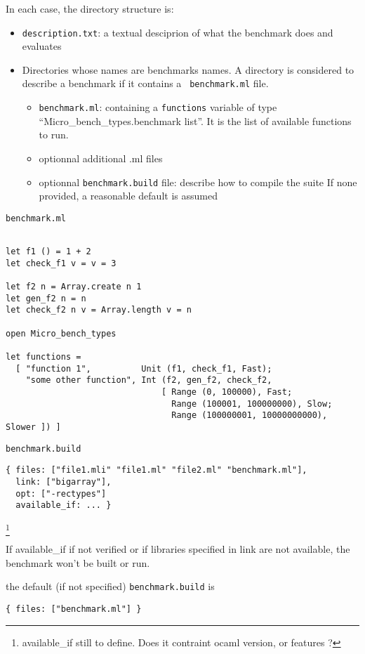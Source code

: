 \documentclass[11pt,a4paper]{article}
\begin{document}
In each case, the directory structure is:

\begin{itemize}
\item {\tt description.txt}: a textual desciprion of what the benchmark does and evaluates
\item Directories whose names are benchmarks names. A directory is
  considered to describe a benchmark if it contains a {\tt
    benchmark.ml} file.
  \begin{itemize}
  \item {\tt benchmark.ml}: containing a {\tt functions} variable of
    type ``Micro\_bench\_types.benchmark list''. It is the list of
    available functions to run.
  \item optionnal additional .ml files
  \item optionnal {\tt benchmark.build} file: describe how to compile the
    suite If none provided, a reasonable default is assumed
  \end{itemize}
\end{itemize}

{\tt benchmark.ml}
\begin{verbatim}

let f1 () = 1 + 2
let check_f1 v = v = 3

let f2 n = Array.create n 1
let gen_f2 n = n
let check_f2 n v = Array.length v = n

open Micro_bench_types

let functions =
  [ "function 1",          Unit (f1, check_f1, Fast);
    "some other function", Int (f2, gen_f2, check_f2,
                               [ Range (0, 100000), Fast;
                                 Range (100001, 100000000), Slow;
                                 Range (100000001, 10000000000), Slower ]) ]

\end{verbatim}

{\tt benchmark.build}
\begin{verbatim}
{ files: ["file1.mli" "file1.ml" "file2.ml" "benchmark.ml"],
  link: ["bigarray"],
  opt: ["-rectypes"]
  available_if: ... }
\end{verbatim}
\footnote{available\_if still to define. Does it contraint ocaml version, or features ?}

If available\_if if not verified or if libraries specified in link are
not available, the benchmark won't be built or run.

the default (if not specified) {\tt benchmark.build} is
\begin{verbatim}
{ files: ["benchmark.ml"] }
\end{verbatim}
\end{document}
